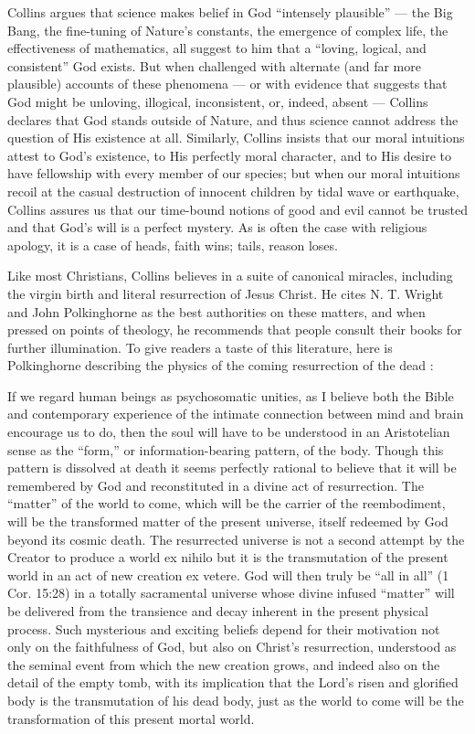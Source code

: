 \documentclass[a4paper,14pt]{extarticle}
\begin{document}
Collins argues that science makes belief in God ``intensely plausible'' --- the Big Bang, the fine-tuning of Nature’s constants, the emergence of complex life, the effectiveness of mathematics, all suggest to him that a ``loving, logical, and consistent'' God exists.
But when challenged with alternate (and far more plausible) accounts of these phenomena --- or with evidence that suggests that God might be unloving, illogical, inconsistent, or, indeed, absent --- Collins declares that God stands outside of Nature, and thus science cannot address the question of His existence at all.
Similarly, Collins insists that our moral intuitions attest to God’s existence, to His perfectly moral character, and to His desire to have fellowship with every member of our species;
but when our moral intuitions recoil at the casual destruction of innocent children by tidal wave or earthquake, Collins assures us that our time-bound notions of good and evil cannot be trusted and that God’s will is a perfect mystery.
As is often the case with religious apology, it is a case of heads, faith wins;
tails, reason loses.

Like most Christians, Collins believes in a suite of canonical miracles, including the virgin birth and literal resurrection of Jesus Christ.
He cites N. T. Wright and John Polkinghorne as the best authorities on these matters, and when pressed on points of theology, he recommends that people consult their books for further illumination.
To give readers a taste of this literature, here is Polkinghorne describing the physics of the coming resurrection of the dead :

If we regard human beings as psychosomatic unities, as I believe both the Bible and contemporary experience of the intimate connection between mind and brain encourage us to do, then the soul will have to be understood in an Aristotelian sense as the ``form,'' or information-bearing pattern, of the body.
Though this pattern is dissolved at death it seems perfectly rational to believe that it will be remembered by God and reconstituted in a divine act of resurrection.
The ``matter'' of the world to come, which will be the carrier of the reembodiment, will be the transformed matter of the present universe, itself redeemed by God beyond its cosmic death.
The resurrected universe is not a second attempt by the Creator to produce a world ex nihilo but it is the transmutation of the present world in an act of new creation ex vetere.
God will then truly be ``all in all'' (1 Cor. 15:28) in a totally sacramental universe whose divine infused ``matter'' will be delivered from the transience and decay inherent in the present physical process.
Such mysterious and exciting beliefs depend for their motivation not only on the faithfulness of God, but also on Christ’s resurrection, understood as the seminal event from which the new creation grows, and indeed also on the detail of the empty tomb, with its implication that the Lord’s risen and glorified body is the transmutation of his dead body, just as the world to come will be the transformation of this present mortal world.
\end{document}
